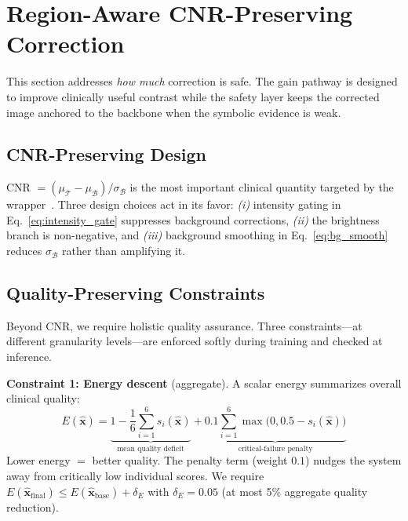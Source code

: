 \documentclass{ieeetj}
\begin{document}
\section{Region-Aware CNR-Preserving Correction}
\label{sec:cnr}

This section addresses \emph{how much} correction is safe. The gain pathway is designed to improve clinically useful contrast while the safety layer keeps the corrected image anchored to the backbone when the symbolic evidence is weak.

\subsection{CNR-Preserving Design}
\label{sec:cnr_design}
CNR $=(\mu_\mathcal{T}-\mu_\mathcal{B})/\sigma_\mathcal{B}$ is the most important clinical quantity targeted by the wrapper~\cite{rodriguez2020generalized}. Three design choices act in its favor: \emph{(i)} intensity gating in Eq.~\eqref{eq:intensity_gate} suppresses background corrections, \emph{(ii)} the brightness branch is non-negative, and \emph{(iii)} background smoothing in Eq.~\eqref{eq:bg_smooth} reduces $\sigma_\mathcal{B}$ rather than amplifying it.

\subsection{Quality-Preserving Constraints}
\label{sec:formal}
Beyond CNR, we require holistic quality assurance. Three constraints---at different granularity levels---are enforced softly during training and checked at inference.

\textbf{Constraint 1: Energy descent} (aggregate). A scalar energy summarizes overall clinical quality:
\begin{equation}
E(\hat{\mathbf{x}}) = \underbrace{1 - \frac{1}{6}\sum_{i=1}^{6} s_i(\hat{\mathbf{x}})}_{\text{mean quality deficit}} + \underbrace{0.1 \sum_{i=1}^{6} \max\big(0, 0.5 - s_i(\hat{\mathbf{x}})\big)}_{\text{critical-failure penalty}}
\label{eq:energy}
\end{equation}
Lower energy $=$ better quality. The penalty term (weight $0.1$) nudges the system away from critically low individual scores. We require $E(\hat{\mathbf{x}}_\text{final}) \leq E(\hat{\mathbf{x}}_\text{base}) + \delta_E$ with $\delta_E = 0.05$ (at most 5\% aggregate quality reduction).
\end{document}

